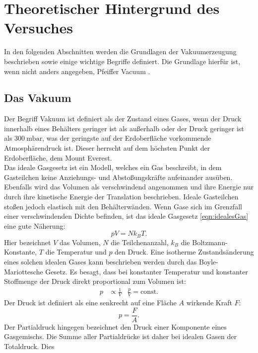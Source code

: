 \section{Theoretischer Hintergrund des Versuches}
\label{sec:Theorie}
In den folgenden Abschnitten werden die Grundlagen der Vakuumerzeugung beschrieben
sowie einige wichtige Begriffe definiert. Die Grundlage hierfür ist, wenn nicht anders
angegeben, Pfeiffer Vacuum \cite{pfeiffer}.

\subsection{Das Vakuum}
Der Begriff Vakuum ist definiert als der Zustand eines Gases, wenn der Druck
innerhalb eines Behälters geringer ist als außerhalb oder der Druck geringer
ist als $\SI{300}{\milli\bar}$, was der geringste auf der Erdoberfläche
vorkommende Atmosphärendruck ist. Dieser herrscht auf dem höchsten Punkt der Erdoberfläche,
dem Mount Everest.\\
Das ideale Gasgesetz ist ein Modell, welches ein Gas beschreibt, in dem Gasteilchen
keine Anziehungs- und Abstoßungskräfte aufeinander ausüben. Ebenfalls wird das Volumen
als verschwindend angenommen und ihre Energie nur durch ihre kinetische Energie der Translation
beschrieben. Ideale Gasteilchen stoßen jedoch elastisch mit den Behälterwänden.
Wenn Gase sich im Grenzfall einer verschwindenden Dichte befinden, ist das
ideale Gasgesetz \ref{eqn:idealesGas} eine gute Näherung:
\begin{equation}
 pV = N k_{B} T.
 \label{eqn:idealesGas}
\end{equation}
Hier bezeichnet $V$ das Volumen, $N$ die Teilchenanzahl, $k_{B}$ die
Boltzmann-Konstante, $T$ die Temperatur und $p$ den Druck.
Eine isotherme Zustandsänderung eines solchen idealen Gases kann beschrieben
werden durch das Boyle-Mariottesche Gesetz.
Es besagt, dass bei konstanter Temperatur und konstanter Stoffmenge der Druck direkt
proportional zum Volumen ist:
\begin{align}
  p & \propto \frac{1}{V} & \frac{p}{V} = \text{const}.
  \label{eqn:boylemariotte}
\end{align}
Der Druck ist definiert als eine senkrecht auf eine Fläche $A$ wirkende Kraft $F$:
\begin{equation}
  p = \frac{F}{A}.
  \label{eqn:druck}
\end{equation}
Der Partialdruck hingegen bezeichnet den Druck einer Komponente eines Gasgemischs.
Die Summe aller Partialdrücke ist daher bei idealen Gasen der Totaldruck. Dies
